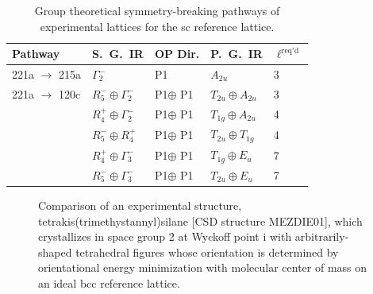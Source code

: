 \documentclass[preprint]{revtex4}
\begin{document}
\pagebreak

\begin{table}[!ht]
\caption{Group theoretical symmetry-breaking pathways of
experimental lattices for the sc reference
lattice.}\label{pathwaysSC}\tiny
\begin{tabular}{lllll}\hline
Pathway & S.~G.~IR & OP Dir. & P.~G.~IR & $\ell^{\mathrm{req'd}}$  \\
\hline
221a $\rightarrow$ 215a & $\Gamma_2^-$ & P1 & $A_{2u}$ & 3 \\
221a $\rightarrow$ 120c & $R_5^-\oplus \Gamma_2^-$ & P1$ \oplus$ P1 & $T_{2u} \oplus A_{2u}$  & 3 \\
& $R_4^+\oplus \Gamma_2^-$ & P1$ \oplus$ P1 & $T_{1g} \oplus A_{2u}$ & 4 \\
& $R_5^-\oplus R_4^+$ & P1$ \oplus$ P1 & $T_{2u} \oplus T_{1g}$  & 4 \\
& $R_4^+\oplus \Gamma_3^-$ & P1$ \oplus$ P1 & $T_{1g} \oplus E_u$  & 7 \\
& $R_5^-\oplus \Gamma_3^-$ & P1$ \oplus$ P1 & $T_{2u} \oplus E_u$  & 7 \\
\hline
\end{tabular}
\end{table}

\pagebreak

\begin{figure}[!ht]
\caption{Comparison of an experimental structure,
tetrakis(trimethystannyl)silane  [CSD structure MEZDIE01], which
crystallizes in space group 2 at Wyckoff point i with
arbitrarily-shaped tetrahedral figures whose orientation is
determined by orientational energy minimization with molecular
center of mass on an ideal bcc reference lattice.\label{compare}}
\end{figure}
\end{document}
